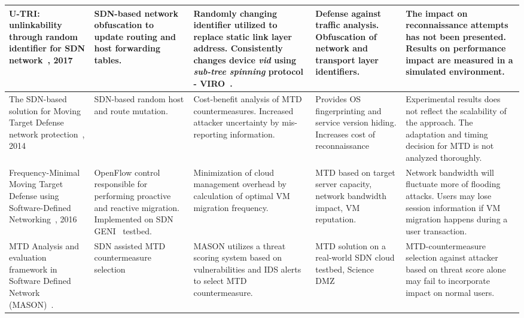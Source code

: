 \begin{table}[!htp]
\begin{tabular}{|p{25mm}|p{25mm}|p{35mm}|p{35mm}|p{35mm}|}
            U-TRI: unlinkability through random identifier for SDN network~, 2017 & SDN-based network obfuscation to update routing and host forwarding tables. & Randomly changing identifier utilized to replace static link layer address. Consistently changes device \textit{vid} using \textit{sub-tree spinning} protocol - VIRO~.  & Defense against traffic analysis. Obfuscation of network and transport layer identifiers. & The impact on reconnaissance attempts has not been presented. Results on performance impact are measured in a simulated environment.\\
            \hline
            The SDN-based solution for Moving Target Defense network protection~, 2014 & SDN-based random host and route mutation. & Cost-benefit analysis of MTD countermeasures. Increased attacker uncertainty by mis-reporting information. & Provides OS fingerprinting and service version hiding. Increases cost of reconnaissance & Experimental results does not reflect the scalability of the approach. The adaptation and timing decision for MTD is not analyzed thoroughly.\\
            \hline
            Frequency-Minimal Moving Target Defense using Software-Defined Networking~, 2016 & OpenFlow control responsible for performing proactive and reactive migration. Implemented on SDN GENI~ testbed. & Minimization of cloud management overhead by calculation of optimal VM migration frequency. & MTD based on target server capacity, network bandwidth impact, VM reputation. & Network bandwidth will fluctuate more of flooding attacks. Users may lose session information if VM migration happens during a user transaction. \\
            \hline
            MTD Analysis and evaluation framework in Software Defined Network (MASON)~. & SDN assisted MTD countermeasure selection &
            MASON utilizes a threat scoring system based on vulnerabilities and IDS alerts to select MTD countermeasure. & MTD solution on a real-world SDN cloud testbed,  Science DMZ~ & MTD-countermeasure selection against attacker based on threat score alone may fail to incorporate impact on normal users. \\
            \hline 
        \end{tabular}
    \end{table}
\fi



